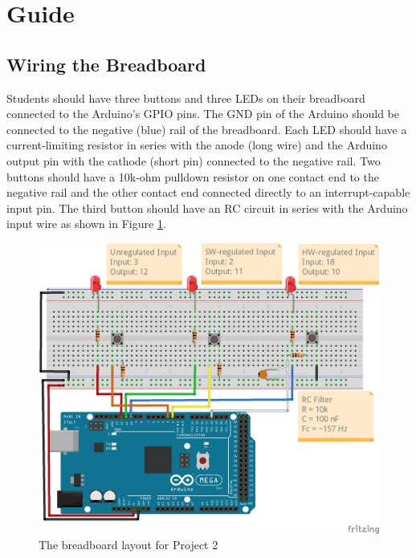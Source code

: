 \documentclass{article}
\begin{document}
\section*{Guide}
    \subsection*{Wiring the Breadboard}
    Students should have three buttons and three LEDs on their breadboard connected to the Arduino's GPIO pins.
    The GND pin of the Arduino should be connected to the negative (blue) rail of the breadboard.
    Each LED should have a current-limiting resistor in series with the anode (long wire) and the Arduino output pin with the cathode (short pin) connected to  the negative rail.
    Two buttons should have a 10k-ohm pulldown resistor on one contact end to the negative rail and the other contact end connected directly to an interrupt-capable input pin.
    The third button should have an RC circuit in series with the Arduino input wire as shown in Figure \ref{fig:p2_digital_inputs_bb}. 

    \begin{figure}
        \centering
        \includegraphics[]{p2_digital_inputs_bb.png}
        \caption{The breadboard layout for Project 2}
        \label{fig:p2_digital_inputs_bb}
    \end{figure}
\end{document}
